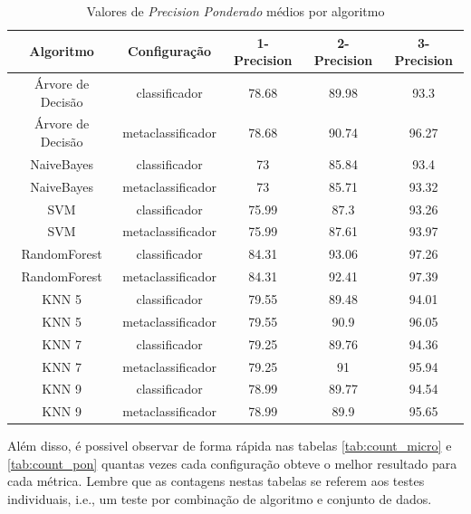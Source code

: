 \begin{table}[h!]
  \begin{center}
    \resizebox{\textwidth}{!} {
    \begin{tabular}{ccccc}
      \hline
      \textbf{Algoritmo} & \textbf{Configuração} & \textbf{1-Precision} & \textbf{2-Precision} & \textbf{3-Precision}\\
      \hline

Árvore de Decisão	&	classificador	&	78.68	&	89.98	&	93.3	\\
Árvore de Decisão	&	metaclassificador	&	78.68	&	90.74	&	96.27	\\
NaiveBayes	&	classificador	&	73	&	85.84	&	93.4	\\
NaiveBayes	&	metaclassificador	&	73	&	85.71	&	93.32	\\
SVM	&	classificador	&	75.99	&	87.3	&	93.26	\\
SVM	&	metaclassificador	&	75.99	&	87.61	&	93.97	\\
RandomForest	&	classificador	&	84.31	&	93.06	&	97.26	\\
RandomForest	&	metaclassificador	&	84.31	&	92.41	&	97.39	\\
KNN 5	&	classificador	&	79.55	&	89.48	&	94.01	\\
KNN 5	&	metaclassificador	&	79.55	&	90.9	&	96.05	\\
KNN 7	&	classificador	&	79.25	&	89.76	&	94.36	\\
KNN 7	&	metaclassificador	&	79.25	&	91	&	95.94	\\
KNN 9	&	classificador	&	78.99	&	89.77	&	94.54	\\
KNN 9	&	metaclassificador	&	78.99	&	89.9	&	95.65	\\

      \hline
    \end{tabular}
    }
    \caption{Valores de \textit{Precision Ponderado} médios por algoritmo}
    \label{tab:prec_pon}
  \end{center}
\end{table}

Além disso, é possivel observar de forma rápida nas tabelas \ref{tab:count_micro} e \ref{tab:count_pon} quantas vezes cada configuração obteve o melhor resultado para cada métrica.
Lembre que as contagens nestas tabelas se referem aos testes individuais, i.e., um teste por combinação de algoritmo e conjunto de dados.

